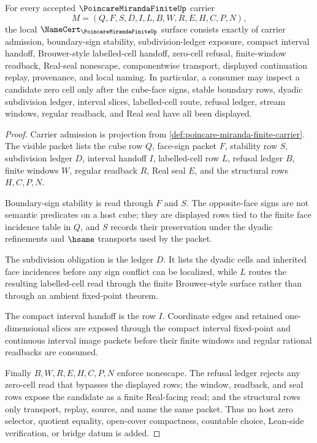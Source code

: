 \begin{theorem}
\label{thm:poincare-miranda-finite-namecert-obligations}
For every accepted $\PoincareMirandaFiniteUp$ carrier
$$
M=(Q,F,S,D,I,L,B,W,R,E,H,C,P,N),
$$
the local $\NameCert_{\PoincareMirandaFiniteUp}$ surface consists exactly of carrier admission, boundary-sign stability, subdivision-ledger exposure, compact interval handoff, Brouwer-style labelled-cell handoff, zero-cell refusal, finite-window readback, Real-seal nonescape, componentwise transport, displayed continuation replay, provenance, and local naming. In particular, a consumer may inspect a candidate zero cell only after the cube-face signs, stable boundary rows, dyadic subdivision ledger, interval slices, labelled-cell route, refusal ledger, stream windows, regular readback, and Real seal have all been displayed.
\end{theorem}
\begin{proof}
Carrier admission is projection from \autoref{def:poincare-miranda-finite-carrier}. The visible packet lists the cube row $Q$, face-sign packet $F$, stability row $S$, subdivision ledger $D$, interval handoff $I$, labelled-cell row $L$, refusal ledger $B$, finite windows $W$, regular readback $R$, Real seal $E$, and the structural rows $H,C,P,N$.

Boundary-sign stability is read through $F$ and $S$. The opposite-face signs are not semantic predicates on a host cube; they are displayed rows tied to the finite face incidence table in $Q$, and $S$ records their preservation under the dyadic refinements and $\hsame$ transports used by the packet.

The subdivision obligation is the ledger $D$. It lists the dyadic cells and inherited face incidences before any sign conflict can be localized, while $L$ routes the resulting labelled-cell read through the finite Brouwer-style surface rather than through an ambient fixed-point theorem.

The compact interval handoff is the row $I$. Coordinate edges and retained one-dimensional slices are exposed through the compact interval fixed-point and continuous interval image packets before their finite windows and regular rational readbacks are consumed.

Finally $B,W,R,E,H,C,P,N$ enforce nonescape. The refusal ledger rejects any zero-cell read that bypasses the displayed rows; the window, readback, and seal rows expose the candidate as a finite Real-facing read; and the structural rows only transport, replay, source, and name the same packet. Thus no host zero selector, quotient equality, open-cover compactness, countable choice, Lean-side verification, or bridge datum is added.
\end{proof}

